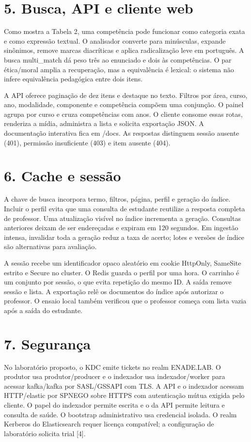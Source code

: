 \documentclass[12pt,a4paper]{article}
\begin{document}
\section*{5. Busca, API e cliente web}
Como mostra a Tabela 2, uma competência pode funcionar como categoria exata e como expressão textual. O analisador converte para minúsculas, expande sinônimos, remove marcas diacríticas e aplica radicalização leve em português. A busca multi\_match dá peso três ao enunciado e dois às competências. O par ética/moral amplia a recuperação, mas a equivalência é lexical: o sistema não infere equivalência pedagógica entre dois itens.

A API oferece paginação de dez itens e destaque no texto. Filtros por área, curso, ano, modalidade, componente e competência compõem uma conjunção. O painel agrupa por curso e cruza competências com anos. O cliente consome essas rotas, renderiza a mídia, administra a lista e solicita exportação JSON. A documentação interativa fica em /docs. As respostas distinguem sessão ausente (401), permissão insuficiente (403) e item ausente (404).

\clearpage
\section*{6. Cache e sessão}
A chave de busca incorpora termo, filtros, página, perfil e geração do índice. Incluir o perfil evita que uma consulta de estudante reutilize a resposta completa de professor. Uma atualização visível no índice incrementa a geração. Consultas anteriores deixam de ser endereçadas e expiram em 120 segundos. Em ingestão intensa, invalidar toda a geração reduz a taxa de acerto; lotes e versões de índice são alternativas para avaliação.

A sessão recebe um identificador opaco aleatório em cookie HttpOnly, SameSite estrito e Secure no cluster. O Redis guarda o perfil por uma hora. O carrinho é um conjunto por sessão, o que evita repetição do mesmo ID. A saída remove sessão e lista. A exportação relê os documentos do índice após autorizar o professor. O ensaio local também verificou que o professor começa com lista vazia após a saída do estudante.

\section*{7. Segurança}
No laboratório proposto, o KDC emite tickets no realm ENADE.LAB. O produtor usa produtor/producer e o indexador usa indexador/worker para acessar kafka/kafka por SASL/GSSAPI com TLS. A API e o indexador acessam HTTP/elastic por SPNEGO sobre HTTPS com autenticação mútua exigida pelo cliente. O papel do indexador permite escrita e o da API permite leitura e consulta de saúde. O bootstrap administrativo usa credencial isolada. O realm Kerberos do Elasticsearch requer licença compatível; a configuração de laboratório solicita trial [4].
\end{document}
